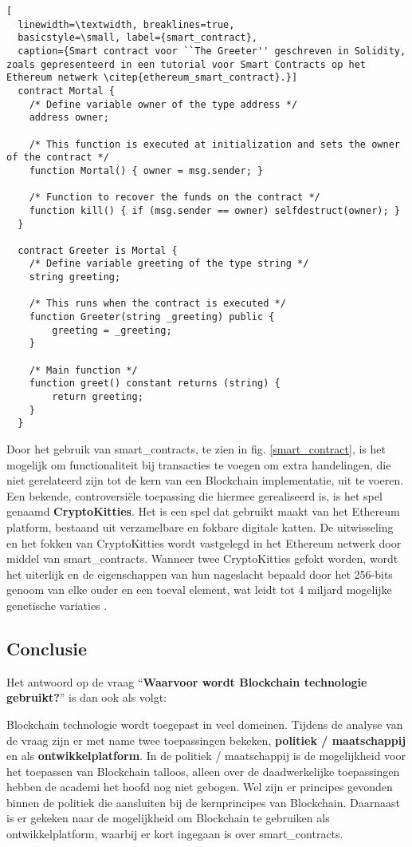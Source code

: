 \begin{lstlisting}[
  linewidth=\textwidth, breaklines=true, 
  basicstyle=\small, label={smart_contract},
  caption={Smart contract voor ``The Greeter'' geschreven in Solidity, zoals gepresenteerd in een tutorial voor Smart Contracts op het Ethereum netwerk \citep{ethereum_smart_contract}.}]
  contract Mortal {
    /* Define variable owner of the type address */
    address owner;

    /* This function is executed at initialization and sets the owner of the contract */
    function Mortal() { owner = msg.sender; }

    /* Function to recover the funds on the contract */
    function kill() { if (msg.sender == owner) selfdestruct(owner); }
  }

  contract Greeter is Mortal {
    /* Define variable greeting of the type string */
    string greeting;

    /* This runs when the contract is executed */
    function Greeter(string _greeting) public {
        greeting = _greeting;
    }

    /* Main function */
    function greet() constant returns (string) {
        return greeting;
    }
  }
\end{lstlisting}
\clearpage
Door het gebruik van \glspl{smart_contract}, te zien in fig. \ref{smart_contract}, is het mogelijk om functionaliteit bij transacties te voegen om extra handelingen, die niet gerelateerd zijn tot de kern van een Blockchain implementatie, uit te voeren. Een bekende, controversiële toepassing die hiermee gerealiseerd is, is het spel genaamd \textbf{CryptoKitties}. Het is een spel dat gebruikt maakt van het Ethereum platform, bestaand uit verzamelbare en fokbare digitale katten. De uitwisseling en het fokken van CryptoKitties wordt vastgelegd in het Ethereum netwerk door middel van \glspl{smart_contract}. Wanneer twee CryptoKitties gefokt worden, wordt het uiterlijk en de eigenschappen van hun nageslacht bepaald door het 256-bits genoom van elke ouder en een toeval element, wat leidt tot 4 miljard mogelijke genetische variaties \citep{cryptokitties}.

\subsection{Conclusie}

Het antwoord op de vraag ``\textbf{Waarvoor wordt Blockchain technologie gebruikt?}'' is dan ook als volgt:

Blockchain technologie wordt toegepast in veel domeinen. Tijdens de analyse van de vraag zijn er met name twee toepassingen bekeken, \textbf{politiek / maatschappij} en als \textbf{ontwikkelplatform}. In de politiek / maatschappij is de mogelijkheid voor het toepassen van Blockchain talloos, alleen over de daadwerkelijke toepassingen hebben de academi het hoofd nog niet gebogen. Wel zijn er principes gevonden binnen de politiek die aansluiten bij de kernprincipes van Blockchain. Daarnaast is er gekeken naar de mogelijkheid om Blockchain te gebruiken als ontwikkelplatform, waarbij er kort ingegaan is over \glspl{smart_contract}.
